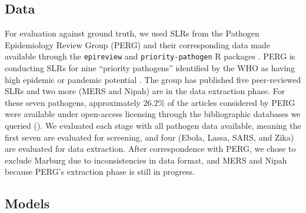 \subsection{Data}
\label{sec:methods_data}
For evaluation against ground truth, we used SLRs from the Pathogen Epidemiology Review Group (PERG) and their corresponding data made available through the \texttt{epireview} and \texttt{priority-pathogen} R packages \cite{naidooEpireviewToolsUpdate2025, nashPrioritypathogens2026}. PERG is conducting SLRs for nine ``priority pathogens'' identified by the WHO as having high epidemic or pandemic potential \cite{worldhealthorganizationPathogensPrioritizationScientific2024}. The group has published five peer-reviewed SLRs \cite{cuomo-dannenburgMarburgVirusDisease2024, doohanLassaFeverOutbreaks2024, nashEbolaVirusDisease2024, morgensternSevereAcuteRespiratory2025,mccain2026systematic} and two more (MERS and Nipah) are in the data extraction phase. For these seven pathogens, approximately $26.2\%$ of the articles considered by PERG were available under open-access licensing through the bibliographic databases we queried (). We evaluated each \name{} stage with all pathogen data available, meaning the first seven are evaluated for screening, and four (Ebola, Lassa, SARS, and Zika) are evaluated for data extraction. After correspondence with PERG, we chose to exclude Marburg due to inconsistencies in data format, and MERS and Nipah because PERG's extraction phase is still in progress.



\subsection{Models}

